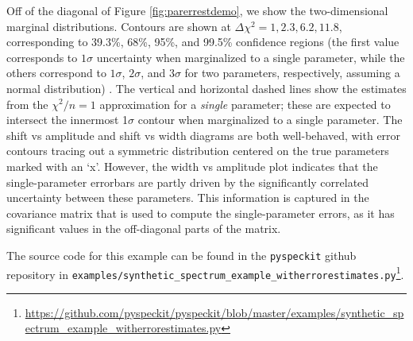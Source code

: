 \documentclass[twocolumn]{aastex63}
\newcommand{\pyspeckit}{\texttt{pyspeckit}\xspace}
\begin{document}
Off of the diagonal of Figure \ref{fig:parerrestdemo}, we show the
two-dimensional marginal distributions.  Contours
are shown at
$\Delta\chi^2=1,2.3,6.2,11.8$, corresponding to 39.3\%, 68\%, 95\%, and 99.5\%
confidence regions
(the first value corresponds to $1\sigma$ uncertainty when marginalized to a single parameter, while the others correspond to $1\sigma$, $2\sigma$, and
$3\sigma$ for two parameters, respectively, assuming a normal
distribution) .  The
vertical and horizontal dashed lines show the estimates from the $\chi^2/n=1$
approximation for a \emph{single} parameter; these are  expected to intersect
the innermost 1$\sigma$ contour  when marginalized to a single parameter. 
The shift vs amplitude and shift vs width diagrams are both well-behaved, with error
contours tracing out a symmetric distribution centered on the true parameters marked
with an `x'.
However, the width vs amplitude plot indicates that the single-parameter
errorbars %
are partly driven by the significantly correlated uncertainty between 
these parameters.
This information is captured in the covariance
matrix that is used to compute the single-parameter errors, as it has
significant values in the off-diagonal parts of the matrix.  

The source code for this example can be found in the \pyspeckit github
repository in \texttt{examples/synthetic\_spectrum\_example\_witherrorestimates.py}\footnote{\url{https://github.com/pyspeckit/pyspeckit/blob/master/examples/synthetic_spectrum_example_witherrorestimates.py}}.
\end{document}
